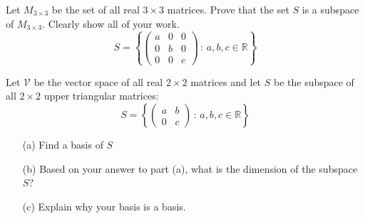 \begin{problem}
        Let $M_{3 \times 3}$ be the set of all real $3 \times 3$ matrices.
        Prove that the set $S$ is a subspace of $M_{3
        \times 3}$. Clearly show all of your work.
        \[ S = \left\{ \begin{pmatrix} a & 0 & 0 \\ 0 & b & 0 \\ 0 & 0 & c \end{pmatrix}
        \, : \, a,b,c \in \mathbb{R} \right\} \]
\end{problem}

\begin{problem}
        Let $\mathcal{V}$ be the vector space of all real $2 \times 2$
        matrices and let $S$ be the subspace of all $2 \times 2$ upper triangular matrices:
    \[ S = \left\{ \begin{pmatrix} a & b \\ 0 & c \end{pmatrix} \, : \, a,b,c \in
            \mathbb{R} \right\} \]
            \begin{enumerate}
                \item[(a)] Find a basis of $S$
                \solution{
                \[ \mathcal{B} = \left\{ \begin{pmatrix} 1 & 0 \\ 0 & 0 \end{pmatrix} ,
                    \begin{pmatrix} 0 & 1 \\ 0 & 0 \end{pmatrix} ,\begin{pmatrix} 0 & 0 \\
                    0 & 1 \end{pmatrix} \right\} \]
                }
        \item[(b)] Based on your answer to part (a), what is the dimension of the
            subspace $S$?
            \solution{
                \[ dim(S) = 3 \]
            }
        \item[(c)] Explain why your basis is a basis.
        \end{enumerate}

\end{problem}
